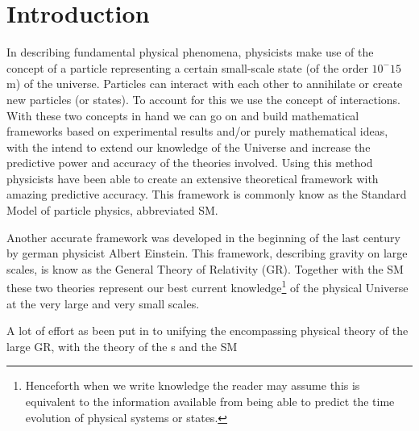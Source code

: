 \section{Introduction}
In describing fundamental physical phenomena, physicists make use of the concept of a particle representing a certain small-scale state (of the order $10^-15$ m) of the universe. Particles can interact with each other to annihilate or create new particles (or states). To account for this we use the concept of interactions. With these two concepts in hand we can go on and build mathematical frameworks based on experimental results and/or purely mathematical ideas, with the intend to extend our knowledge of the Universe and increase the predictive power and accuracy of the theories involved. Using this method physicists have been able to create an extensive theoretical framework with amazing predictive accuracy. This framework is commonly know as the Standard Model of particle physics, abbreviated SM.

Another accurate framework was developed in the beginning of the last century by german physicist Albert Einstein. This framework, describing gravity on large scales, is know as the General Theory of Relativity (GR). Together with the SM these two theories represent our best current knowledge\footnote{Henceforth when we write knowledge the reader may assume this is equivalent to the information available from being able to predict the time evolution of physical systems or states.} of the physical Universe at the very large and very small scales.

A lot of effort as been put in to unifying the encompassing physical theory of the large GR, with the theory of the s and the SM
